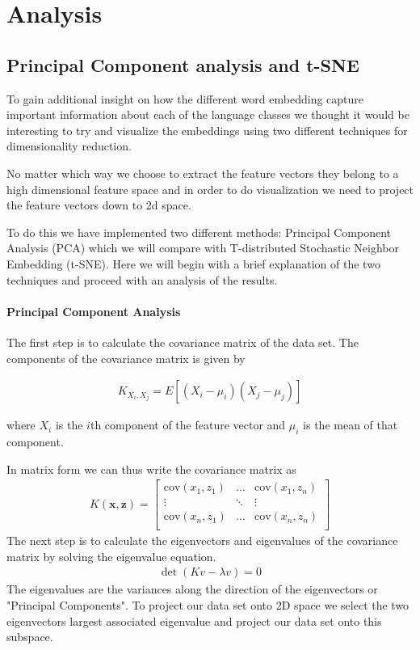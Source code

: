 \section{Analysis}

\subsection{Principal Component analysis and t-SNE}
To gain additional insight on how the different word embedding capture important information about each of the language classes we thought it would be interesting to try and visualize the embeddings using two different techniques for dimensionality reduction.

No matter which way we choose to extract the feature vectors they belong to a high dimensional feature space and in order to do visualization we need to project the feature vectors down to 2d space.

To do this we have implemented two different methods: Principal Component Analysis (PCA) which we will compare with T-distributed Stochastic Neighbor Embedding (t-SNE).
Here we will begin with a brief explanation of the two techniques and proceed with an analysis of the results.

\paragraph{Principal Component Analysis}

The first step is to calculate the covariance matrix of the data set.
The components of the covariance matrix is given by

\begin{align}
K_{X_i,X_j} = E[(X_i - \mu_i )(X_j -  \mu_j)]
\end{align}

where $X_{i}$ is the $i$th component of the feature vector and $\mu_{i}$ is the mean of that component.

In matrix form we can thus write the covariance matrix as
\begin{align}
K(\mathbf{x},\mathbf{z}) =
\begin{bmatrix}
    \text{cov}(x_1,z_1) &  \dots  & \text{cov}(x_1,z_n) \\
    \vdots & \ddots     & \vdots \\
    \text{cov}(x_n,z_1) & \dots  & \text{cov}(x_n,z_n) \\
\end{bmatrix}
\end{align}
The next step is to calculate the eigenvectors and eigenvalues of the covariance matrix by solving the eigenvalue equation.
\begin{align}
\det (K v-\lambda v) = 0
\end{align}
The eigenvalues are the variances along the direction of the eigenvectors or "Principal Components". To project our data set onto 2D space we select the two eigenvectors largest associated eigenvalue and project our data set onto this subspace.

